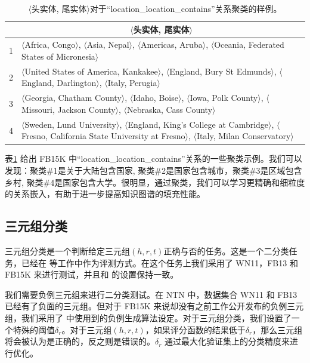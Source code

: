     \begin{table}[htb]
    \small
    \centering
    \caption{$\langle$头实体, 尾实体$\rangle$对于``location\_location\_contains''关系聚类的样例。}
     \label{label_1:cluster_example}
    \begin{tabular}{|c|p{}|}
    \hline
    & \multicolumn{1}{|c|}{$\langle$头实体, 尾实体$\rangle$} \\
    \hline
    1 & $\langle$Africa, Congo$\rangle$, $\langle$Asia, Nepal$\rangle$, $\langle$Americas, Aruba$\rangle$,  $\langle$Oceania, Federated States of Micronesia$\rangle$
    \\ \hline
    2 & $\langle$United States of America, Kankakee$\rangle$,
    $\langle$England, Bury St Edmunds$\rangle$,
    $\langle$England, Darlington$\rangle$, $\langle$Italy, Perugia$\rangle$ \\ \hline
    3 & $\langle$Georgia, Chatham County$\rangle$, $\langle$Idaho, Boise$\rangle$, $\langle$Iowa, Polk County$\rangle$, $\langle$Missouri, Jackson County$\rangle$, $\langle$Nebraska, Cass County$\rangle$
    \\ \hline
    4 & $\langle$Sweden, Lund University$\rangle$, $\langle$England, King's College at Cambridge$\rangle$, $\langle$Fresno, California State University at Fresno$\rangle$, $\langle$Italy, Milan Conservatory$\rangle$
    \\\hline
    \end{tabular}
    \end{table}

    表\ref{label_1:cluster_example} 给出 FB15K 中``location\_location\_contains''关系的一些聚类示例。我们可以发现：聚类\#1是关于大陆包含国家, 聚类\#2是国家包含城市，聚类\#3是区域包含乡村, 聚类\#4是国家包含大学。很明显，通过聚类，我们可以学习更精确和细粒度的关系嵌入，有助于进一步提高知识图谱的填充性能。


    \subsection{三元组分类}
    三元组分类是一个判断给定三元组$(h, r, t)$正确与否的任务。这是一个二分类任务，已经在 \cite{socher2013reasoning,wang2014knowledge} 等工作中作为评测方式。在这个任务上我们采用了 WN11，FB13 和 FB15K 来进行测试，并且和 \cite{wang2014knowledge}的设置保持一致。

    我们需要负例三元组来进行二分类测试。在 NTN \cite{socher2013reasoning} 中，数据集合 WN11 和 FB13 已经有了负面的三元组。但对于 FB15K 来说却没有之前工作公开发布的负例三元组，我们采用了 \cite{socher2013reasoning} 中使用到的负例生成算法设定。对于三元组分类，我们设置了一个特殊的阈值$\delta_r$。对于三元组$(h,r,t)$，如果评分函数的结果低于$\delta_r$，那么三元组将会被认为是正确的，反之则是错误的。$\delta_r$ 通过最大化验证集上的分类精度来进行优化。



